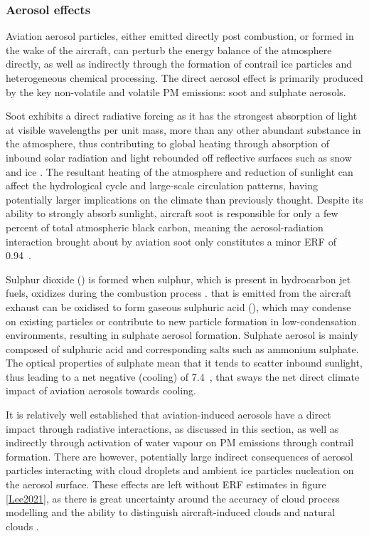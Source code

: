 \subsubsection{Aerosol effects}
Aviation aerosol particles, either emitted directly post combustion, or formed in the wake of the aircraft, can perturb the energy balance of the atmosphere directly, as well as indirectly through the formation of contrail ice particles and heterogeneous chemical processing. The direct aerosol effect is primarily produced by the key non-volatile and volatile PM emissions: soot and sulphate aerosols.

Soot exhibits a direct radiative forcing as it has the strongest absorption of light at visible wavelengths per unit mass, more than any other abundant substance in the atmosphere, thus contributing to global heating through absorption of inbound solar radiation and light rebounded off reflective surfaces such as snow and ice \cite{Bond2013}. The resultant heating of the atmosphere and reduction of sunlight can affect the hydrological cycle and large-scale circulation patterns, having potentially larger implications on the climate than previously thought. Despite its ability to strongly absorb sunlight, aircraft soot is responsible for only a few percent of total atmospheric black carbon, meaning the aerosol-radiation interaction brought about by aviation soot only constitutes a minor ERF of 0.94~.

Sulphur dioxide () is formed when sulphur, which is present in hydrocarbon jet fuels, oxidizes during the combustion process \cite{Brown1996}.  that is emitted from the aircraft exhaust can be oxidised to form gaseous sulphuric acid (), which may condense on existing particles or contribute to new particle formation in low-condensation environments, resulting in sulphate aerosol formation. Sulphate aerosol is mainly composed of sulphuric acid and corresponding salts such as ammonium sulphate. The optical properties of sulphate mean that it tends to scatter inbound sunlight, thus leading to a net negative (cooling) of 7.4~, that sways the net direct climate impact of aviation aerosols towards cooling. 

It is relatively well established that aviation-induced aerosols have a direct impact through radiative interactions, as discussed in this section, as well as indirectly through activation of water vapour on PM emissions through contrail formation. There are however, potentially large indirect consequences of aerosol particles interacting with cloud droplets and ambient ice particles nucleation on the aerosol surface. These effects are left without ERF estimates in figure \ref{Lee2021}, as there is great uncertainty around the accuracy of cloud process modelling and the ability to distinguish aircraft-induced clouds and natural clouds \cite{Penner2018}.

